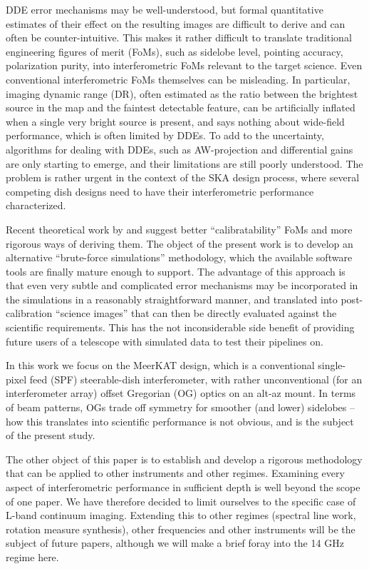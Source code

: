 \documentclass{aa}
\begin{document}
DDE error mechanisms may be well-understood, but formal quantitative estimates of their effect on the resulting images are difficult to derive and can often be counter-intuitive. This makes it rather difficult to translate traditional engineering figures of merit (FoMs), such as sidelobe level, pointing accuracy, polarization purity, into interferometric FoMs relevant to the target science. Even conventional interferometric FoMs themselves can be misleading. In particular, imaging dynamic range (DR), often estimated as the ratio between the brightest source in the map and the faintest detectable feature, can be artificially inflated when a single very bright source is present, and says nothing about wide-field  performance, which is often limited by DDEs. To add to the uncertainty, algorithms for dealing with DDEs, such as AW-projection \citep{SB:imageplane} and differential gains \citep{RRIME3} are only starting to emerge, and their limitations are still poorly understood. The problem is rather urgent in the context of the SKA design process, where several competing dish designs need to have their interferometric performance characterized.

Recent theoretical work by \citep{Wijnhnolds:imaging} and \citep{Carozzi:ixr} suggest better ``calibratability'' FoMs and more rigorous ways of deriving them. The object of the present work is to develop an alternative ``brute-force simulations'' methodology, which the available software tools are finally mature enough to support. The advantage of this approach is that even very subtle and complicated error mechanisms may be incorporated in the simulations in a reasonably straightforward manner, and translated into post-calibration ``science images'' that can then be directly evaluated against the scientific requirements. This has the not inconsiderable side benefit of providing future users of a telescope with simulated data to test their pipelines on.

In this work we focus on the MeerKAT design, which is a conventional single-pixel feed (SPF) steerable-dish interferometer, with rather unconventional (for an interferometer array) offset Gregorian (OG) optics on an alt-az mount. In terms of beam patterns, OGs trade off symmetry for smoother (and lower) sidelobes -- how this translates into scientific performance is not obvious, and is the subject of the present study. 

The other object of this paper is to establish and develop a rigorous methodology that can be applied to other instruments and other regimes. Examining every aspect of interferometric performance in sufficient depth is well beyond the scope of one paper. We have therefore decided to limit ourselves to the specific case of L-band continuum imaging. Extending this to other regimes (spectral line work, rotation measure synthesis), other frequencies and other instruments will be the subject of future papers, although we will  make a brief foray into the 14 GHz regime here.
\end{document}
